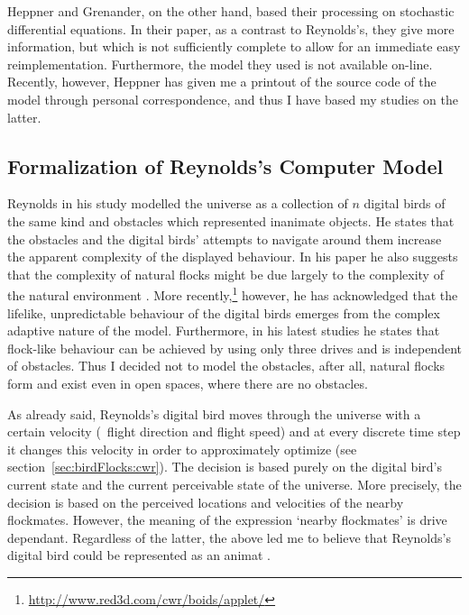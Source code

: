 Heppner and Grenander, on the other hand, based their processing on stochastic differential equations. In their paper, as a contrast to Reynolds's, they give more information, but which is not sufficiently complete to allow for an immediate easy reimplementation. Furthermore, the model they used is not available on-line. Recently, however, Heppner has given me a printout of the source code of the model through personal correspondence, and thus I have based my studies on the latter. 

\subsection{Formalization of Reynolds's Computer Model}
\label{sec:animat:cwr}
Reynolds in his study \cite{reynolds:1987} modelled the universe as a collection of $n$ digital birds of the same kind and obstacles which represented inanimate objects. He states that the obstacles and the digital birds' attempts to navigate around them increase the apparent complexity of the displayed behaviour. In his paper he also suggests that the complexity of natural flocks might be due largely to the complexity of the natural environment \cite{reynolds:1987}. More recently,\footnote{\href{http://www.red3d.com/cwr/boids/applet/}{http://www.red3d.com/cwr/boids/applet/}} however, he has acknowledged that the lifelike, unpredictable behaviour of the digital birds emerges from the complex adaptive nature of the model. Furthermore, in his latest studies \cite{reynolds:1999,reynolds:2000} he states that flock-like behaviour can be achieved by using only three drives and is independent of obstacles. Thus I decided not to model the obstacles, after all, natural flocks form and exist even in open spaces, where there are no obstacles.

As already said, Reynolds's digital bird moves through the universe with a certain velocity (\ie\ flight direction and flight speed) and at every discrete time step it changes this velocity in order to approximately optimize  (see section~\ref{sec:birdFlocks:cwr}). The decision is based purely on the digital bird's current state and the current perceivable state of the universe. More precisely, the decision is based on the perceived locations and velocities of the nearby flockmates. However, the meaning of the expression `nearby flockmates' is drive dependant. Regardless of the latter, the above led me to believe that Reynolds's digital bird could be represented as an animat \cite{lebar_bajec:2002,lebar_bajec:2003a,lebar_bajec:2003b}.

